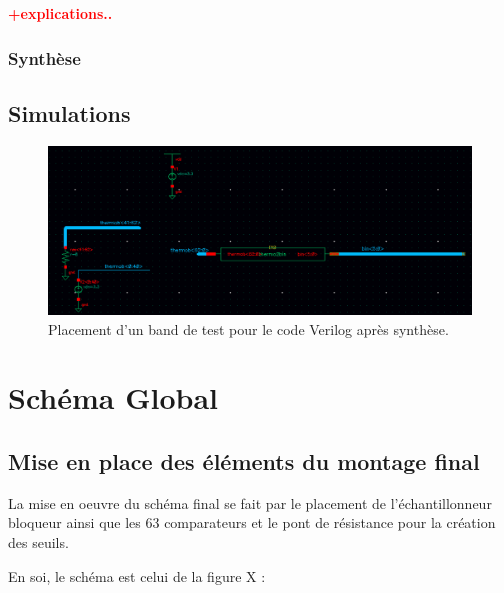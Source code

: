 \documentclass[11pt]{article}
\begin{document}
\textbf{\textcolor{red}{+explications..\cite{Thermometer}}}

\subsubsection{Synth\`ese}

\clearpage
\subsection{Simulations}

\begin{figure}[!htb]
      \centering
      \includegraphics[width=\linewidth]{test_thermo2bin.png}
      \caption{Placement d'un band de test pour le code Verilog apr\`es synth\`ese.}
\end{figure}%

\clearpage


\section{Sch\'ema Global}
\subsection{Mise en place des \'el\'ements du montage final}
La mise en oeuvre du sch\'ema final se fait par le placement de l'\'echantillonneur bloqueur
ainsi que les 63 comparateurs et le pont de r\'esistance pour la cr\'eation des seuils.

En soi, le sch\'ema est celui de la figure X :

\end{document}
